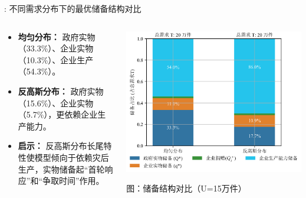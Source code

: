 \documentclass[9pt]{beamer}
\begin{document}
\begin{frame}{\insertsectionhead: 不同需求分布下的最优储备结构对比}
    \begin{columns}
        \begin{column}{0.5\textwidth}
            \begin{itemize}
                \item \textbf{均匀分布：} 政府实物（33.3\%）、企业实物（10.3\%）、企业生产（54.3\%）。
                \item \textbf{反高斯分布：} 政府实物（15.6\%）、企业实物（5.7\%），更依赖企业生产能力。
                \item \textbf{启示：} 反高斯分布长尾特性使模型倾向于依赖灾后生产，实物储备起“首轮响应”和“争取时间”作用。
            \end{itemize}
        \end{column}

        \begin{column}{0.5\textwidth}
            \centering
            \includegraphics[width=\linewidth]{basic_pictures/储备结构对比.png}
            \vspace{0.5em}

            {\small 图：储备结构对比（U=15万件）}
        \end{column}
    \end{columns}
\end{frame}
\end{document}
